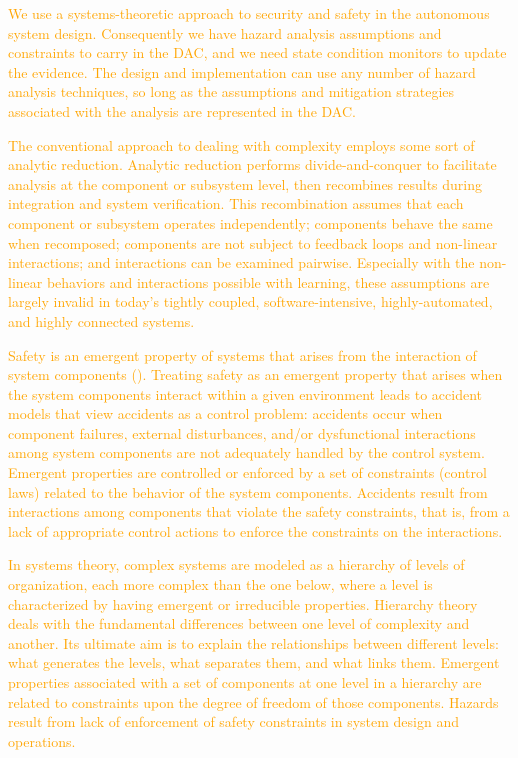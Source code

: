 \textcolor{orange}{We use a systems-theoretic approach to security and safety in the autonomous system design.  Consequently we have hazard analysis assumptions and constraints to carry in the DAC, and we need state condition monitors to update the evidence. The design and implementation can use any number of hazard analysis techniques, so long as the assumptions and mitigation strategies associated with the analysis are represented in the DAC.  
}

\textcolor{orange}{
The conventional approach to dealing with complexity employs some sort of analytic reduction. Analytic reduction performs divide-and-conquer to facilitate analysis at the component or subsystem level, then recombines results during integration and system verification.  This recombination assumes that each component or subsystem operates independently; components behave the same when recomposed; components are not subject to feedback loops and non-linear interactions; and interactions can be examined pairwise.  Especially with the non-linear behaviors and interactions possible with learning, these assumptions are largely invalid in today's tightly coupled, software-intensive, highly-automated, and highly connected systems. 
}

\textcolor{orange}{
Safety is an emergent property of systems that arises from the interaction of system components (\cite{NL04}).  Treating safety as an emergent property that arises when the system components interact within a given environment leads to accident models that view accidents as a control problem: accidents occur when component failures, external disturbances, and/or dysfunctional interactions among system components are not adequately handled by the control system. Emergent properties are controlled or enforced by a set of constraints (control laws) related to the behavior of the system components. Accidents result from interactions among components that violate the safety constraints, that is, from a lack of appropriate control actions to enforce the constraints on the interactions.  
}

\textcolor{orange}{
In systems theory, complex systems are modeled as a hierarchy of levels of organization, each more complex than the one below, where a level is characterized by having emergent or irreducible properties. Hierarchy theory deals with the fundamental differences between one level of complexity and another. Its ultimate aim is to explain the relationships between different levels: what generates the levels, what separates them, and what links them. Emergent properties associated with a set of components at one level in a hierarchy are related to constraints upon the degree of freedom of those components.  Hazards result from lack of enforcement of safety constraints in system design and operations.
}

